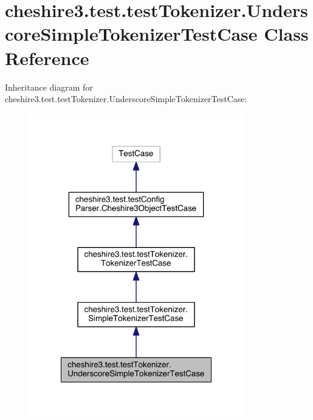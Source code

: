 \hypertarget{classcheshire3_1_1test_1_1test_tokenizer_1_1_underscore_simple_tokenizer_test_case}{\section{cheshire3.\-test.\-test\-Tokenizer.\-Underscore\-Simple\-Tokenizer\-Test\-Case Class Reference}
\label{classcheshire3_1_1test_1_1test_tokenizer_1_1_underscore_simple_tokenizer_test_case}
}


Inheritance diagram for cheshire3.\-test.\-test\-Tokenizer.\-Underscore\-Simple\-Tokenizer\-Test\-Case\-:
\nopagebreak
\begin{figure}[H]
\begin{center}
\leavevmode
\includegraphics[width=264pt]{classcheshire3_1_1test_1_1test_tokenizer_1_1_underscore_simple_tokenizer_test_case__inherit__graph}
\end{center}
\end{figure}


